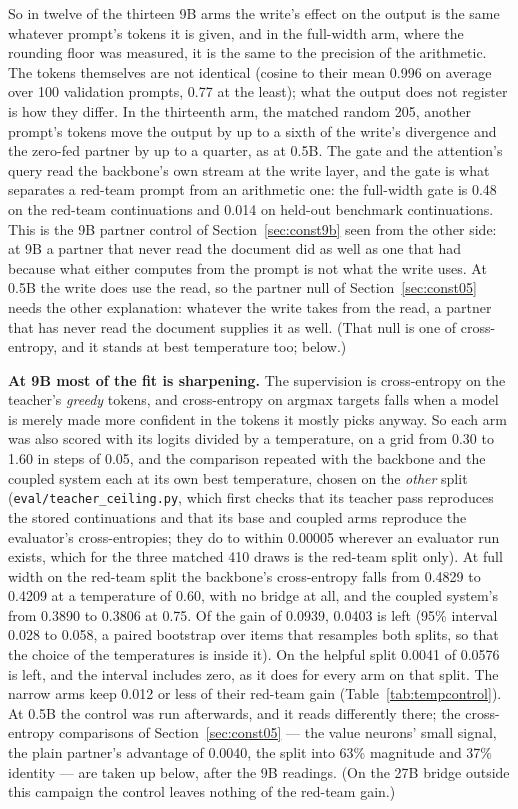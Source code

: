 \documentclass[11pt]{article}
\newcommand{\code}[1]{\texttt{#1}}
\begin{document}
So in twelve of the thirteen 9B arms the write's effect on the output is the same
whatever prompt's tokens it is given, and in the full-width arm, where the rounding
floor was measured, it is the same to the precision of the arithmetic. The tokens
themselves are not identical (cosine to their mean 0.996 on average over 100
validation prompts, 0.77 at the least); what the output does not register is how
they differ. In the thirteenth arm, the matched random 205, another prompt's tokens
move the output by up to a sixth of the write's divergence and the zero-fed partner
by up to a quarter, as at 0.5B. The gate and the attention's
query read the backbone's own stream at the write layer, and the gate is what
separates a red-team prompt from an arithmetic one: the full-width gate is 0.48 on
the red-team continuations and 0.014 on held-out benchmark continuations. This is
the 9B partner control of Section~\ref{sec:const9b} seen from the other side: at 9B
a partner that never read the document did as well as one that had because what
either computes from the prompt is not what the write uses. At 0.5B the write does
use the read, so the partner null of Section~\ref{sec:const05} needs the other
explanation: whatever the write takes from the read, a partner that has never read
the document supplies it as well. (That null is one of cross-entropy, and it
stands at best temperature too; below.)

\textbf{At 9B most of the fit is sharpening.} The supervision is cross-entropy on the
teacher's \emph{greedy} tokens, and cross-entropy on argmax targets falls when a
model is merely made more confident in the tokens it mostly picks anyway. So each
arm was also scored with its logits divided by a temperature, on a grid from 0.30
to 1.60 in steps of 0.05, and the comparison repeated with the backbone and the
coupled system each at its own best temperature, chosen on the \emph{other} split
(\code{eval/\allowbreak{}teacher\_ceiling.py}, which first checks that its teacher pass
reproduces the stored continuations and that its base and coupled arms reproduce
the evaluator's cross-entropies; they do to within 0.00005 wherever an evaluator run
exists, which for the three matched 410 draws is the red-team split only). At full width on the red-team
split the backbone's cross-entropy falls from 0.4829 to 0.4209 at a temperature of
0.60, with no bridge at all, and the coupled system's from 0.3890 to 0.3806 at
0.75. Of the gain of 0.0939, 0.0403 is left (95\% interval 0.028 to 0.058, a paired
bootstrap over items that resamples both splits, so that the choice of the
temperatures is inside it). On the helpful split 0.0041 of 0.0576 is left, and the
interval includes zero, as it does for every arm on that split. The narrow arms
keep 0.012 or less of their red-team gain (Table~\ref{tab:tempcontrol}). At 0.5B
the control was run afterwards, and it reads differently there; the cross-entropy
comparisons of Section~\ref{sec:const05} --- the value neurons' small signal, the
plain partner's advantage of 0.0040, the split into 63\% magnitude and 37\%
identity --- are taken up below, after the 9B readings. (On the 27B bridge outside
this campaign the control leaves nothing of the red-team gain.)
\end{document}
